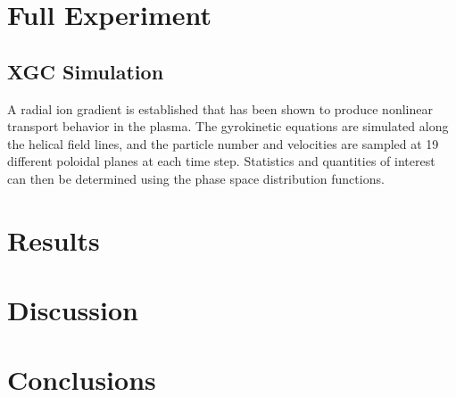 \documentclass{article}
\begin{document}
\section{Full Experiment}

\subsection{XGC Simulation}
A radial ion gradient is established that has been shown to produce nonlinear transport behavior in the plasma. The gyrokinetic equations are simulated along the helical field lines, and the particle number and velocities are sampled at 19 different poloidal planes at each time step. Statistics and quantities of interest can then be determined using the phase space distribution functions. 



 
\section{Results}


\section{Discussion}


\section{Conclusions}
\medskip


\end{document}
